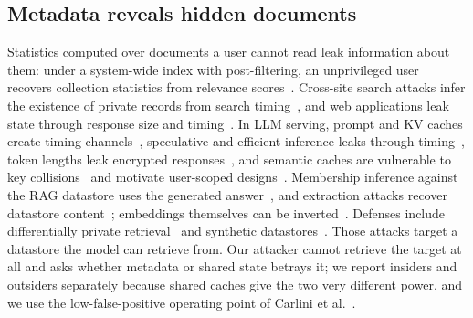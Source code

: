 \subsection{Metadata reveals hidden documents}
Statistics computed over documents a user cannot read leak information about them: under a
system-wide index with post-filtering, an unprivileged user recovers collection statistics from
relevance scores~\cite{buttcher2005security}. Cross-site search attacks infer the existence of private
records from search timing~\cite{gelernter2015xs}, and web applications leak state through response
size and timing~\cite{chen2010sidechannel,bortz2007exposing,felten2000timing}. In LLM serving, prompt
and KV caches create timing channels~\cite{gu2025auditing,song2025earlybird,wu2025know,zheng2024inputsnatch},
speculative and efficient inference leaks through timing~\cite{carlini2024remote}, token lengths leak
encrypted responses~\cite{weiss2024what}, and semantic caches are vulnerable to key
collisions~\cite{zhang2026keycollision,afiffy2026semanticcache} and motivate user-scoped
designs~\cite{gill2024meancache}. Membership inference against the RAG datastore uses the generated
answer~\cite{anderson2025my,li2024generating,naseh2025riddle,liu2025mask}, and extraction attacks
recover datastore content~\cite{zeng2024good,qi2025follow,dimaio2024pirates}; embeddings themselves
can be inverted~\cite{morris2023embeddings}. Defenses include differentially private
retrieval~\cite{koga2024dprag} and synthetic datastores~\cite{zeng2024sage}. Those attacks target a
datastore the model can retrieve from. Our attacker cannot retrieve the target at all and asks
whether metadata or shared state betrays it; we report insiders and outsiders separately because
shared caches give the two very different power, and we use the low-false-positive operating point
of Carlini et al.~\cite{carlini2022mia}.

